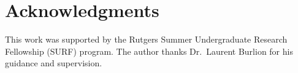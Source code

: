 \documentclass{article}
\theoremstyle{plain}
\theoremstyle{definition}
\theoremstyle{remark}
\begin{document}
\section*{Acknowledgments}
This work was supported by the Rutgers Summer Undergraduate Research Fellowship
(SURF) program. The author thanks Dr.~Laurent Burlion for his guidance and
supervision.


\end{document}
